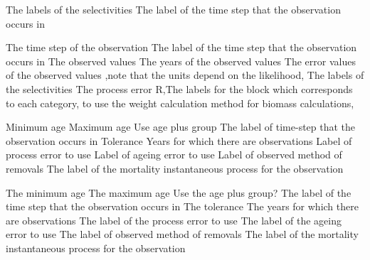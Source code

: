 \par\textbf{}\par
{} {The labels of the selectivities}
 {The label of the time step that the observation occurs in}
\par\textbf{}\par
{} {The time step of the observation}
 {The label of the time step that the observation occurs in}
 {The observed values}
 {The years of the observed values}
 {The error values of the observed values ,note that the units depend on the likelihood,}
 {The labels of the selectivities}
 {The process error}
 {R,The labels for the  block which corresponds to each category, to use the weight calculation method for biomass calculations,}
\par\textbf{}\par
{} {Minimum age}
 {Maximum age}
 {Use age plus group}
 {The label of time-step that the observation occurs in}
 {Tolerance}
 {Years for which there are observations}
 {Label of process error to use}
 {Label of ageing error to use}
 {Label of observed method of removals}
 {The label of the mortality instantaneous process for the observation}
\par\textbf{}\par
{} {The minimum age}
 {The maximum age}
 {Use the age plus group?}
 {The label of the time step that the observation occurs in}
 {The tolerance}
 {The years for which there are observations}
 {The label of the process error to use}
 {The label of the ageing error to use}
 {The label of observed method of removals}
 {The label of the mortality instantaneous process for the observation}
\par\textbf{}\par

